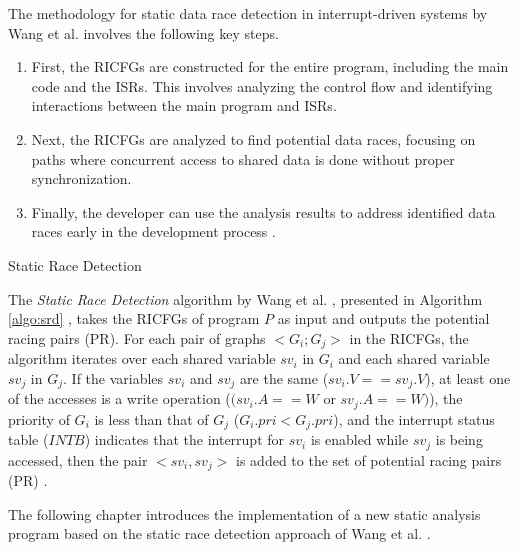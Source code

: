 \documentclass[
fancyheadings, %
%
%
]{stsreprt}
\begin{document}
{		The methodology for static data race detection in interrupt-driven systems by Wang et al. \cite{wang2020} involves the following key steps.
		\begin{enumerate}
			\item First, the \acp{RICFG} are constructed for the entire program, including the main code and the \acp{ISR}. This involves analyzing the control flow and identifying interactions between the main program and \acp{ISR}. 
			\item Next, the \acp{RICFG} are analyzed to find potential data races, focusing on paths where concurrent access to shared data is done without proper synchronization. 
			\item Finally, the developer can use the analysis results to address identified data races early in the development process \cite{wang2020}.
		\end{enumerate}
		
		\begin{algorithm}[H]
			\label{algo:srd}
			\caption{Static Race Detection}
			
			\BlankLine
		\end{algorithm}
		
		The \textit{Static Race Detection} algorithm by Wang et al. \cite{wang2020}, presented in Algorithm \ref{algo:srd} , takes the \acp{RICFG} of program $P$ as input and outputs the potential racing pairs (PR). For each pair of graphs $< G_i ; G_j >$ in the \acp{RICFG}, the algorithm iterates over each shared variable $sv_i$ in $G_i$ and each shared variable $sv_j$ in $G_j$. If the variables $sv_i$ and $sv_j$ are the same ($sv_i.V == sv_j.V$), at least one of the accesses is a write operation ($(sv_i.A == W$ or $sv_j.A == W)$), the priority of $G_i$ is less than that of $G_j$ ($G_i.pri < G_j.pri$), and the interrupt status table ($INTB$) indicates that the interrupt for $sv_i$ is enabled while $sv_j$ is being accessed, then the pair $<sv_i, sv_j>$ is added to the set of potential racing pairs (PR) \cite{wang2020}.
		
		The following chapter introduces the implementation of a new static analysis program based on the static race detection approach of Wang et al. \cite{wang2020}.
	
}
\end{document}
